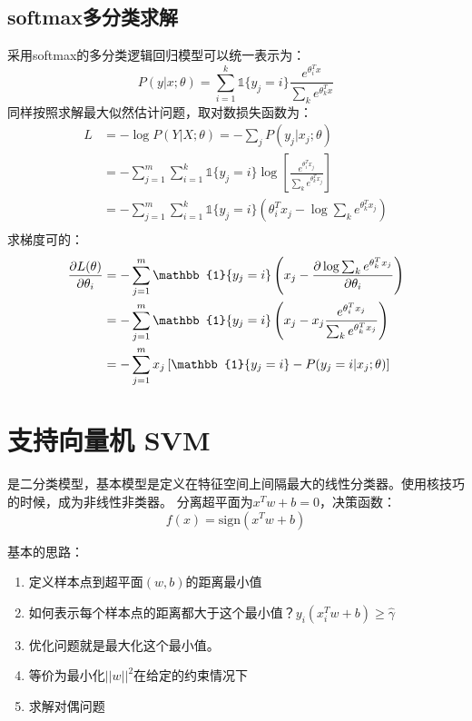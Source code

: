 \subsection{softmax多分类求解}
采用softmax的多分类逻辑回归模型可以统一表示为：
\begin{equation*}
    P(y|x;\theta) = \sum_{i=1}^k \mathbb{1}\{ y_j=i \} \frac{e^{\theta_i^T x}}{\sum_k e^{\theta_k^T x}}
\end{equation*}
同样按照求解最大似然估计问题，取对数损失函数为：
\begin{align*}
    L &= -\log P(Y|X;\theta) = -\sum_j P(y_j|x_j;\theta) \\
    &= -\sum_{j=1}^{m} \sum_{i=1}^k \mathbb{1}\{ y_j=i \} \log \left[\frac{e^{\theta_i^T x_j}}{\sum_k e^{\theta_k^T x_j}} \right] \\
    &= -\sum_{j=1}^{m} \sum_{i=1}^k \mathbb{1}\{ y_j=i \} \left( \theta_i^T x_j - \log \sum_k e^{\theta_k^T x_j} \right)\\
\end{align*}
求梯度可的：
\begin{align*}
    \Q{L(\theta)}{\theta_i} &= -\sum_{j=1}^{m} \mathbb{1}\{ y_j=i \} \left(x_j - \Q{\log \sum_k e^{\theta_k^T x_j}}{\theta_i} \right)\\
    &= -\sum_{j=1}^{m} \mathbb{1}\{ y_j=i \} \left(x_j - x_j \frac{e^{\theta_i^T x_j}}{\sum_k e^{\theta_k^T x_j}} \right)\\
    &= -\sum_{j=1}^{m} x_j \left[ \mathbb{1}\{ y_j=i \} - P(y_j=i|x_j;\theta) \right]
\end{align*}


\section{支持向量机 SVM}
是二分类模型，基本模型是定义在特征空间上间隔最大的线性分类器。使用核技巧的时候，成为非线性非类器。
分离超平面为$x^T w + b = 0$，决策函数：
\begin{equation*}
    f(x) = \text{sign}(x^T w + b)
\end{equation*}

基本的思路：
\begin{enumerate}
\item 定义样本点到超平面$(w,b)$的距离最小值
\item 如何表示每个样本点的距离都大于这个最小值？$y_i(x_i^T w + b) \ge \hat{\gamma}$
\item 优化问题就是最大化这个最小值。
\item 等价为最小化$||w||^2$在给定的约束情况下
\item 求解对偶问题
\end{enumerate}

